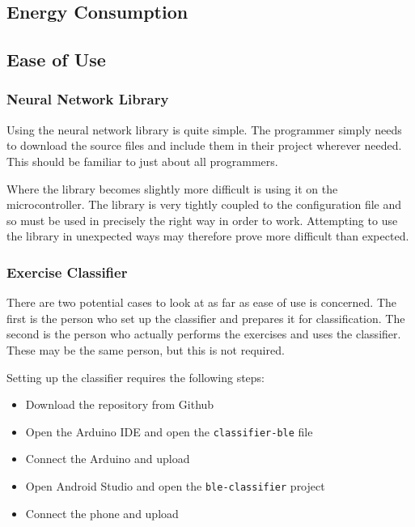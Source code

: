 \documentclass[a4paper]{article}
\begin{document}
\subsection{Energy Consumption}%


\subsection{Ease of Use}%

\subsubsection{Neural Network Library}

Using the neural network library is quite simple. The programmer simply needs to download the source files and include them in their project wherever needed. This should be familiar to just about all programmers.

Where the library becomes slightly more difficult is using it on the microcontroller. The library is very tightly coupled to the configuration file and so must be used in precisely the right way in order to work. Attempting to use the library in unexpected ways may therefore prove more difficult than expected.

\subsubsection{Exercise Classifier}

There are two potential cases to look at as far as ease of use is concerned. The first is the person who set up the classifier and prepares it for classification. The second is the person who actually performs the exercises and uses the classifier. These may be the same person, but this is not required.

Setting up the classifier requires the following steps:

\begin{itemize}
\item Download the repository from Github
\item Open the Arduino IDE and open the \lstinline{classifier-ble} file
\item Connect the Arduino and upload
\item Open Android Studio and open the \lstinline{ble-classifier} project
\item Connect the phone and upload
\end{itemize}
\end{document}
